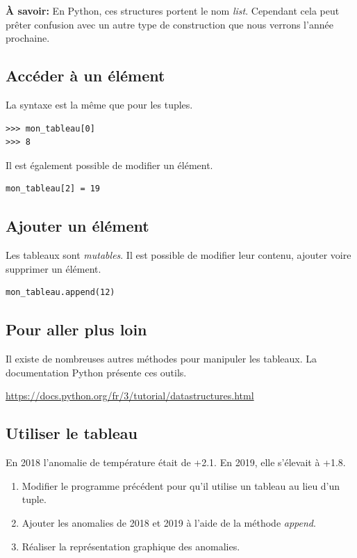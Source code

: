 \documentclass[a4paper,11pt]{article}
\begin{document}
\begin{Form}
\textbf{À savoir:} En Python, ces structures portent le nom \emph{list}. Cependant cela peut prêter confusion avec un autre type de construction que nous verrons l'année prochaine.
\subsection{Accéder à un élément}
La syntaxe est la même que pour les tuples.
\begin{code}[!h]
\begin{lstlisting}
>>> mon_tableau[0]
>>> 8
\end{lstlisting}
\label{accestab}
\end{code}

Il est également possible de modifier un élément.
\begin{center}
\begin{lstlisting}
mon_tableau[2] = 19
\end{lstlisting}
\label{modif}
\end{center}
\subsection{Ajouter un élément}
Les tableaux sont \emph{mutables}. Il est possible de modifier leur contenu, ajouter voire supprimer un élément.
\begin{code}[!h]
\begin{lstlisting}
mon_tableau.append(12)
\end{lstlisting}
\label{ajout}
\end{code}
\subsection{Pour aller plus loin}
Il existe de nombreuses autres méthodes pour manipuler les tableaux. La documentation Python présente ces outils.
\begin{center}
\url{https://docs.python.org/fr/3/tutorial/datastructures.html}
\end{center}
\subsection{Utiliser le tableau}
En 2018 l'anomalie de température était de +2.1. En 2019, elle s'élevait à +1.8.
\begin{activite}
\begin{enumerate}
\item Modifier le programme précédent pour qu'il utilise un tableau au lieu d'un tuple.
\item Ajouter les anomalies de 2018 et 2019 à l'aide de la méthode \emph{append}.
\item Réaliser la représentation graphique des anomalies.
\end{enumerate}
\end{activite}
\end{Form}
\end{document}
